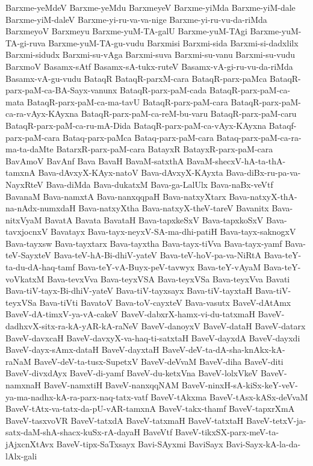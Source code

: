 {Barxme-yeMdeV
Barxme-yeMdu
BarxmeyeV
Barxme-yiMda
Barxme-yiM-dale
Barxme-yiM-daleV
Barxme-yi-ru-va-va-nige
Barxme-yi-ru-vu-da-riMda
BarxmeyoV
Barxmeyu
Barxme-yuM-TA-galU
Barxme-yuM-TAgi
Barxme-yuM-TA-gi-ruva
Barxme-yuM-TA-gu-vudu
Barxmisi
Barxmi-sida
Barxmi-si-dadxlilx
Barxmi-sidudx
Barxmi-su-vAga
Barxmi-suva
Barxmi-su-vanu
Barxmi-su-vudu
BarxmoV
Basamx-sAtf
Basamx-sA-tukx-ruteV
Basamx-vA-gi-ru-vu-da-riMda
Basamx-vA-gu-vudu
BataqR
BataqR-parxM-cara
BataqR-parx-paMca
BataqR-parx-paM-ca-BA-Sayx-vanunx
BataqR-parx-paM-cada
BataqR-parx-paM-ca-mata
BataqR-parx-paM-ca-ma-tavU
BataqR-parx-paM-cara
BataqR-parx-paM-ca-ra-vAyx-KAyxna
BataqR-parx-paM-ca-reM-bu-varu
BataqR-parx-paM-caru
BataqR-parx-paM-ca-ru-mA-Dida
BataqR-parx-paM-ca-vAyx-KAyxna
Bataqf-parx-paM-cara
Bataq-parx-paMca
Bataq-parx-paM-cara
Bataq-parx-paM-ca-ra-ma-ta-daMte
BatarxR-parx-paM-cara
BatayxR
BatayxR-parx-paM-cara
BavAmoV
BavAnf
Bava
BavaH
BavaM-satxthA
BavaM-shecxV-hA-ta-thA-tamxnA
Bava-dAvxyX-KAyx-natoV
Bava-dAvxyX-KAyxta
Bava-diBx-ru-pa-va-NayxRteV
Bava-diMda
Bava-dukatxM
Bava-ga-LalUlx
Bava-naBx-veVtf
BavanaM
Bava-namxtA
Bava-nanxqqpaH
Bava-natxyXtarx
Bava-natxyX-thA-na-nAdx-numxdaH
Bava-natxyXtha
Bava-natxyX-theV-tareV
Bavanitx
Bava-nitxVyaM
BavatA
Bavata
BavataH
Bava-tapxkeSxV
Bava-tapxkoSxV
Bava-tavxjocnxV
Bavatayx
Bava-tayx-neyxV-SA-ma-dhi-patiH
Bava-tayx-saknogxV
Bava-tayxsw
Bava-tayxtarx
Bava-tayxtha
Bava-tayx-tiVva
Bava-tayx-yamf
Bava-teV-SayxteV
Bava-teV-hA-Bi-dhiV-yateV
Bava-teV-hoV-pa-va-NiRtA
Bava-teY-ta-du-dA-haq-tamf
Bava-teY-vA-Buyx-peV-tavwyx
Bava-teY-vAyaM
Bava-teY-voVkatxM
Bava-tevxVva
Bava-teyxVSA
Bava-teyxVSa
Bava-teyxVva
Bavati
Bava-tiV-tayx-Bi-dhiV-yateV
Bava-tiV-tayxsayx
Bava-tiV-tayxtaH
Bava-tiV-teyxVSa
Bava-tiVti
BavatoV
Bava-toV-cayxteV
Bava-vasutx
BaveV-dAtAmx
BaveV-dA-timxV-ya-vA-cakeV
BaveV-dabxrX-hamx-vi-du-tatxmaH
BaveV-dadhxvX-sitx-ra-kA-yAR-kA-raNeV
BaveV-danoyxV
BaveV-dataH
BaveV-datarx
BaveV-davxcaH
BaveV-davxyX-va-haq-ti-satxtaH
BaveV-dayxdA
BaveV-dayxdi
BaveV-dayx-sAmx-dataH
BaveV-dayxtaH
BaveV-deV-ta-dA-sha-knAkx-kA-raNaM
BaveV-deV-ta-tusx-SupetxV
BaveV-deVvaM
BaveV-diha
BaveV-diti
BaveV-divxdAyx
BaveV-di-yamf
BaveV-du-ketxVna
BaveV-lolxVkeV
BaveV-namxnaH
BaveV-namxtiH
BaveV-nanxqqNAM
BaveV-ninxH-sA-kiSx-keY-veV-ya-ma-nadhx-kA-ra-parx-naq-tatx-vatf
BaveV-tAkxma
BaveV-tAsx-kASx-deVvaM
BaveV-tAtx-va-tatx-da-pU-vAR-tamxnA
BaveV-takx-thamf
BaveV-tapxrXmA
BaveV-tasxvoVR
BaveV-tatxdA
BaveV-tatxmaH
BaveV-tatxtaH
BaveV-tetxV-ja-satx-daM-shA-shacx-kuSx-rA-dayaH
BaveVtf
BaveV-tikxSX-parx-meV-ta-jAjxcnXtAvx
BaveV-tipx-SaTxsayx
Bavi-SAyxmi
BaviSayx
Bavi-Sayx-kA-la-da-lAlx-gali
}
